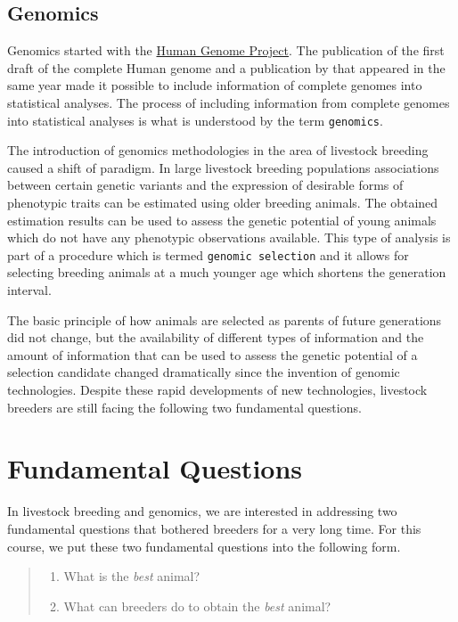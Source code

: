 \documentclass[
]{book}
\providecommand{\tightlist}{%
  \setlength{\itemsep}{0pt}\setlength{\parskip}{0pt}}
\begin{document}
\hypertarget{genomics}{%
\subsection{Genomics}\label{genomics}}

Genomics started with the \href{https://en.wikipedia.org/wiki/Human_Genome_Project}{Human Genome Project}. The publication of the first draft of the complete Human genome \citep{Venter2001} and a publication by \citep{Meuwissen2001} that appeared in the same year made it possible to include information of complete genomes into statistical analyses. The process of including information from complete genomes into statistical analyses is what is understood by the term \texttt{genomics}.

The introduction of genomics methodologies in the area of livestock breeding caused a shift of paradigm. In large livestock breeding populations associations between certain genetic variants and the expression of desirable forms of phenotypic traits can be estimated using older breeding animals. The obtained estimation results can be used to assess the genetic potential of young animals which do not have any phenotypic observations available. This type of analysis is part of a procedure which is termed \texttt{genomic\ selection} and it allows for selecting breeding animals at a much younger age which shortens the generation interval.

The basic principle of how animals are selected as parents of future generations did not change, but the availability of different types of information and the amount of information that can be used to assess the genetic potential of a selection candidate changed dramatically since the invention of genomic technologies. Despite these rapid developments of new technologies, livestock breeders are still facing the following two fundamental questions.

\hypertarget{fundamental-questions}{%
\section{Fundamental Questions}\label{fundamental-questions}}

In livestock breeding and genomics, we are interested in addressing two fundamental questions that bothered breeders for a very long time. For this course, we put these two fundamental questions into the following form.

\begin{quote}
\begin{enumerate}
\def\labelenumi{\arabic{enumi}.}
\tightlist
\item
  What is the \emph{best} animal?
\item
  What can breeders do to obtain the \emph{best} animal?
\end{enumerate}
\end{quote}
\end{document}
